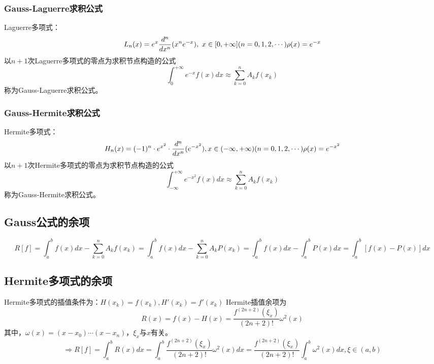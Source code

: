 \subsubsection{Gauss-Laguerre求积公式}
Laguerre多项式：
\begin{equation*}
    L_n(x) = e^x\frac{d^n}{dx^n}(x^ne^{-x}),\  x \in [0,+\infty]\\
    \\(n=0,1,2,\cdots)
    \\\rho(x) = e^{-x}
\end{equation*}
以$n+1$次Laguerre多项式的零点为求积节点构造的公式
\begin{equation*}
    \int_{0}^{+\infty}e^{-x}f(x)dx \approx \sum_{k=0}^{n}A_kf(x_k)
\end{equation*}
称为Gauss-Laguerre求积公式。

\subsubsection{Gauss-Hermite求积公式}
Hermite多项式：
\begin{equation*}
    H_n(x) = (-1)^n\cdot e^{x^2}\cdot \frac{d^n}{dx^n}(e^{-x^2}),x \in (-\infty ,+\infty)
    \\(n = 0,1,2,\cdots)
    \\\rho(x) = e^{-x^2}
\end{equation*}
以$n+1$次Hermite多项式的零点为求积节点构造的公式
\begin{equation*}
    \int_{-\infty}^{+\infty}e^{-x^2}f(x)dx \approx \sum_{k=0}^{n}A_kf(x_k)
\end{equation*}
称为Gauss-Hermite求积公式。

\subsection{Gauss公式的余项}
\begin{equation*}
    R[f] = \int_{a}^{b}f(x)dx -\sum_{k=0}^{n}A_kf(x_k) =\int_{a}^{b}f(x)dx -\sum_{k=0}^{n}A_kP(x_k) = \int_{a}^{b}f(x)dx - \int_{a}^{b}P(x)dx = \int_{a}^{b}[f(x)-P(x)]dx
\end{equation*}

\subsection{Hermite多项式的余项}
Hermite多项式的插值条件为：$H(x_k) = f(x_k),H'(x_k) = f'(x_k)$
Hermite插值余项为
\begin{equation*}
    R(x) = f(x) - H(x) = \frac{f^{(2n+2)}(\xi_x)}{(2n+2)!}\omega^2(x)
\end{equation*}
其中，$\omega(x) = (x-x_0)\cdots (x-x_n)$，$\xi_x$与$x$有关。
\begin{equation*}
    \Rightarrow R[f] = \int_{a}^{b}R(x)dx = \int_{a}^{b}\frac{f^{(2n+2)}(\xi_x)}{(2n+2)!}\omega^2(x)dx = \frac{f^{(2n+2)}(\xi_x)}{(2n+2)!}\int_{a}^{b}\omega^2(x)dx,\xi \in (a,b)
\end{equation*}


